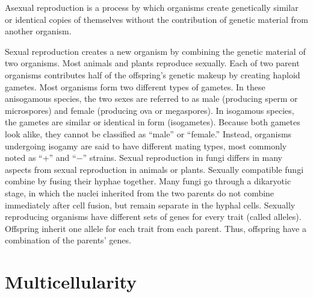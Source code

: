 \documentclass[]{book}
\theoremstyle{definition}
\theoremstyle{definition}
\theoremstyle{definition}
\theoremstyle{remark}
\begin{document}
Asexual reproduction is a process by which organisms create genetically
similar or identical copies of themselves without the contribution of
genetic material from another organism.

Sexual reproduction creates a new organism by combining the genetic
material of two organisms. Most animals and plants reproduce sexually.
Each of two parent organisms contributes half of the offspring's genetic
makeup by creating haploid gametes. Most organisms form two different
types of gametes. In these anisogamous species, the two sexes are
referred to as male (producing sperm or microspores) and female
(producing ova or megaspores). In isogamous species, the gametes are
similar or identical in form (isogametes). Because both gametes look
alike, they cannot be classified as ``male'' or ``female.'' Instead,
organisms undergoing isogamy are said to have different mating types,
most commonly noted as ``+'' and ``−'' strains. Sexual reproduction in
fungi differs in many aspects from sexual reproduction in animals or
plants. Sexually compatible fungi combine by fusing their hyphae
together. Many fungi go through a dikaryotic stage, in which the nuclei
inherited from the two parents do not combine immediately after cell
fusion, but remain separate in the hyphal cells. Sexually reproducing
organisms have different sets of genes for every trait (called alleles).
Offspring inherit one allele for each trait from each parent. Thus,
offspring have a combination of the parents' genes.

\section{Multicellularity}\label{multicellularity}
\end{document}

